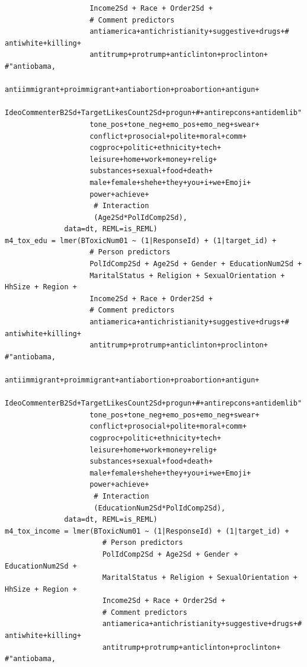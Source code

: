 \documentclass{article}
\begin{document}
\begin{lstlisting}
                    Income2Sd + Race + Order2Sd + 
                    # Comment predictors  
                    antiamerica+antichristianity+suggestive+drugs+# antiwhite+killing+
                    antitrump+protrump+anticlinton+proclinton+ #"antiobama,
                    antiimmigrant+proimmigrant+antiabortion+proabortion+antigun+
                    IdeoCommenterB2Sd+TargetLikesCount2Sd+progun+#+antirepcons+antidemlib"
                    tone_pos+tone_neg+emo_pos+emo_neg+swear+
                    conflict+prosocial+polite+moral+comm+
                    cogproc+politic+ethnicity+tech+
                    leisure+home+work+money+relig+  
                    substances+sexual+food+death+    
                    male+female+shehe+they+you+i+we+Emoji+
                    power+achieve+
                     # Interaction
                     (Age2Sd*PolIdComp2Sd),
              data=dt, REML=is_REML)
m4_tox_edu = lmer(BToxicNum01 ~ (1|ResponseId) + (1|target_id) + 
                    # Person predictors
                    PolIdComp2Sd + Age2Sd + Gender + EducationNum2Sd + 
                    MaritalStatus + Religion + SexualOrientation + HhSize + Region + 
                    Income2Sd + Race + Order2Sd + 
                    # Comment predictors  
                    antiamerica+antichristianity+suggestive+drugs+# antiwhite+killing+
                    antitrump+protrump+anticlinton+proclinton+ #"antiobama,
                    antiimmigrant+proimmigrant+antiabortion+proabortion+antigun+
                    IdeoCommenterB2Sd+TargetLikesCount2Sd+progun+#+antirepcons+antidemlib"
                    tone_pos+tone_neg+emo_pos+emo_neg+swear+
                    conflict+prosocial+polite+moral+comm+
                    cogproc+politic+ethnicity+tech+
                    leisure+home+work+money+relig+  
                    substances+sexual+food+death+    
                    male+female+shehe+they+you+i+we+Emoji+
                    power+achieve+
                     # Interaction
                     (EducationNum2Sd*PolIdComp2Sd),
              data=dt, REML=is_REML)
m4_tox_income = lmer(BToxicNum01 ~ (1|ResponseId) + (1|target_id) + 
                       # Person predictors
                       PolIdComp2Sd + Age2Sd + Gender + EducationNum2Sd + 
                       MaritalStatus + Religion + SexualOrientation + HhSize + Region + 
                       Income2Sd + Race + Order2Sd + 
                       # Comment predictors  
                       antiamerica+antichristianity+suggestive+drugs+# antiwhite+killing+
                       antitrump+protrump+anticlinton+proclinton+ #"antiobama,

\end{lstlisting}
\end{document}
